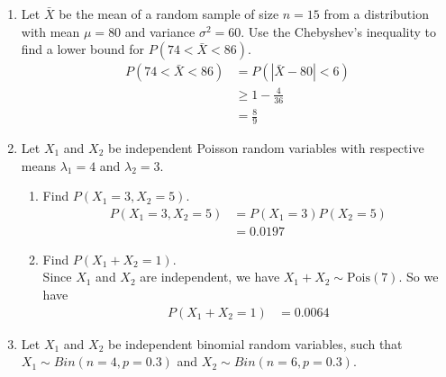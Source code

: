 \documentclass[12pt]{article} %
\newcommand{\Red}{\color{Red}}
\begin{document}
\begin{enumerate}
\begin{enumerate}[label=2.\arabic*]
{$$\begin{aligned}
    P(S < 2100) &= P(\bar{X} < 21) \\
    &= P(Z < 0) \\
    &= 0.5
\end{aligned}$$}
\item What is the probability that for (a random sample of) 100 passengers, the sample mean weight is within 0.5lb of the overall mean (21 lbs)? {\Red $$\begin{aligned}
    P(20.5 < \bar{X} < 21.5) &= P\left(\frac{20.5-21}{5.3/\sqrt{100}} < \frac{\bar{X}-21}{5.3/\sqrt{100}} < \frac{21.5-21}{5.3/\sqrt{100}}\right) \\
    &= P(-0.94 < Z < 0.94) \\
    &= 2(0.8264) - 1 \\
    &= 0.6528
\end{aligned}$$}
(R: \texttt{pnorm(21.5, 21, 0.53) - pnorm(20.5, 21, 0.53)} gives 0.6545)
\end{enumerate}
\newpage
\item Let $\bar{X}$ be the mean of a random sample of size $n=15$ from a distribution with mean $\mu=80$ and variance $\sigma^2=60$.  Use the Chebyshev's inequality to find a lower bound for $P(74<\bar{X}<86)$. \\ {\Red $$\begin{aligned}
    P(74 < \bar{X} < 86) &= P(|\bar{X}-80| < 6) \\
    &\geq 1 - \frac{4}{36} \\
    &= \frac{8}{9}
\end{aligned}$$}
\newpage
\item Let $X_{1}$ and $X_{2}$ be independent Poisson random variables with respective means $\lambda_1=4$ and $\lambda_2=3$. 
\begin{enumerate}[label=4.\arabic*]
\item Find $P(X_1=3,X_2=5)$. \\ {\Red $$\begin{aligned}
    P(X_1 = 3, X_2 = 5) &= P(X_1 = 3) P(X_2 = 5) \\
    &= 0.0197
\end{aligned}$$}
\item Find $P(X_1+X_2=1)$. \\ {\Red Since $X_1$ and $X_2$ are independent, we have $X_1 + X_2 \sim \text{Pois}(7)$. So we have $$\begin{aligned}
    P(X_1 + X_2 = 1) &= 0.0064
\end{aligned}$$}
\end{enumerate}
\newpage
\item Let $X_{1}$ and $X_{2}$ be independent binomial random variables, such that $X_1\sim Bin(n=4, p=0.3)$ and $X_2\sim Bin(n=6, p=0.3)$.

\end{enumerate}
\end{document}

